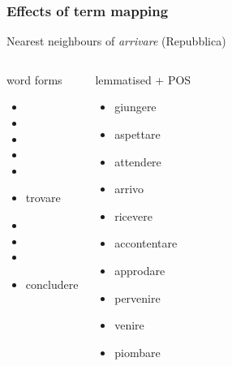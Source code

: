 \documentclass[t]{beamer} %
\begin{document}
\begin{frame}
  \frametitle{Effects of term mapping}

  \centering
  Nearest neighbours of \emph{arrivare} (Repubblica)
  \ungap\footnotesize
  \begin{columns}[t]
    \column{4cm}
    \begin{block}{word forms}
      \begin{itemize}
      \item  {}
      \item  {}
      \item  {}
      \item  {}
      \item  {}
      \item  trovare
      \item  {}
      \item  {}
      \item  {}
      \item  concludere
      \end{itemize}
    \end{block}
    \column{4cm}
    \begin{block}{lemmatised + POS}
      \begin{itemize}
      \item giungere
      \item aspettare
      \item attendere
      \item arrivo 
      \item ricevere
      \item accontentare
      \item approdare
      \item pervenire
      \item venire
      \item piombare
      \end{itemize}
    \end{block}
  \end{columns}
  
  \hfill{}
\end{frame}
\end{document}
